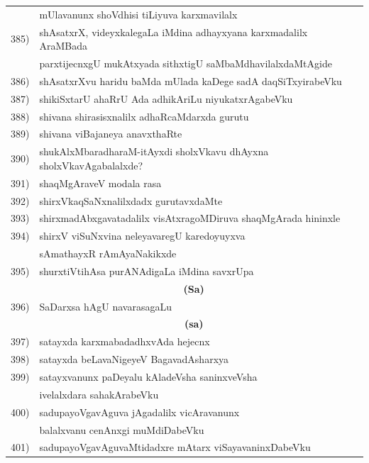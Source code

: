 {\begin{longtable}{@{}cp{7.4cm}r}
      & mUlavanunx shoVdhisi tiLiyuva karxmavilalx & \pageref{page216}\\
 385) & shAsatxrX, videyxkalegaLa iMdina adhayxyana karxmadalilx AraMBada& \\
      & parxtijecnxgU mukAtxyada sithxtigU saMbaMdhavilalxdaMtAgide & \pageref{page40}\\
 386) & shAsatxrXvu haridu baMda mUlada kaDege sadA daqSiTxyirabeVku & \pageref{page142}\\
 387) & shikiSxtarU ahaRrU Ada adhikAriLu niyukatxrAgabeVku  & \pageref{page47b}\\
 388) & shivana shirasisxnalilx adhaRcaMdarxda gurutu & \pageref{page172}\\
 389) & shivana viBajaneya anavxthaRte & \pageref{page126}\\ 
 390) & shukAlxMbaradharaM-itAyxdi sholxVkavu dhAyxna sholxVkavAgabalalxde? & \pageref{page206}\\
 391) & shaqMgAraveV modala rasa & \pageref{page227}\\
 392) & shirxVkaqSaNxnalilxdadx gurutavxdaMte & \pageref{page107}\\
 393) & shirxmadAbxgavatadalilx visAtxragoMDiruva shaqMgArada hininxle & \pageref{page228}\\
 394) & shirxV viSuNxvina neleyavaregU karedoyuyxva & \\
      &  sAmathayxR rAmAyaNakikxde & \pageref{page238}\\
 395) & shurxtiVtihAsa purANAdigaLa iMdina savxrUpa & \pageref{page187}\\[0.3cm] 
      & \multicolumn{1}{c}{\textbf{(Sa)}} & \\[0.3cm]
 396) & SaDarxsa hAgU navarasagaLu & \pageref{page223}\\[0.3cm]
       & \multicolumn{1}{c}{\textbf{(sa)}} & \\[0.3cm] 
 397) & satayxda karxmabadadhxvAda hejecnx & \pageref{page76} \\
 398) & satayxda beLavaNigeyeV BagavadAsharxya & \pageref{page72}\\
 399) & satayxvanunx paDeyalu kAladeVsha saninxveVsha & \\
      & ivelalxdara sahakArabeVku & \pageref{page109}\\
400) & sadupayoVgavAguva jAgadalilx vicAravanunx & \\
     &  balalxvanu cenAnxgi muMdiDabeVku & \pageref{page248}\\ 
401) & sadupayoVgavAguvaMtidadxre mAtarx viSayavaninxDabeVku & \pageref{page252}\\

\end{longtable}}
